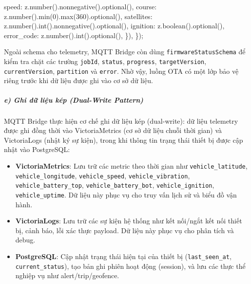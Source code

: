 \documentclass[13pt,a4paper]{extarticle}
\newenvironment{Shaded}{}{}
\newcommand{\DecValTok}[1]{\textcolor[rgb]{0.25,0.63,0.44}{#1}}
\newcommand{\FunctionTok}[1]{\textcolor[rgb]{0.02,0.16,0.49}{#1}}
\newcommand{\NormalTok}[1]{#1}
\newcommand{\OperatorTok}[1]{\textcolor[rgb]{0.40,0.40,0.40}{#1}}
\renewcommand{\\}{\thesislongtableorignewline\hline}%
\providecommand{\tightlist}{%
  \setlength{\itemsep}{0pt}\setlength{\parskip}{0pt}}
\begin{document}
\begin{Shaded}
\begin{Highlighting}[]
\NormalTok{    speed}\OperatorTok{:}\NormalTok{ z}\OperatorTok{.}\FunctionTok{number}\NormalTok{()}\OperatorTok{.}\FunctionTok{nonnegative}\NormalTok{()}\OperatorTok{.}\FunctionTok{optional}\NormalTok{()}\OperatorTok{,}
\NormalTok{    course}\OperatorTok{:}\NormalTok{ z}\OperatorTok{.}\FunctionTok{number}\NormalTok{()}\OperatorTok{.}\FunctionTok{min}\NormalTok{(}\DecValTok{0}\NormalTok{)}\OperatorTok{.}\FunctionTok{max}\NormalTok{(}\DecValTok{360}\NormalTok{)}\OperatorTok{.}\FunctionTok{optional}\NormalTok{()}\OperatorTok{,}
\NormalTok{    satellites}\OperatorTok{:}\NormalTok{ z}\OperatorTok{.}\FunctionTok{number}\NormalTok{()}\OperatorTok{.}\FunctionTok{int}\NormalTok{()}\OperatorTok{.}\FunctionTok{nonnegative}\NormalTok{()}\OperatorTok{.}\FunctionTok{optional}\NormalTok{()}\OperatorTok{,}
\NormalTok{    ignition}\OperatorTok{:}\NormalTok{ z}\OperatorTok{.}\FunctionTok{boolean}\NormalTok{()}\OperatorTok{.}\FunctionTok{optional}\NormalTok{()}\OperatorTok{,}
\NormalTok{    error\_code}\OperatorTok{:}\NormalTok{ z}\OperatorTok{.}\FunctionTok{number}\NormalTok{()}\OperatorTok{.}\FunctionTok{int}\NormalTok{()}\OperatorTok{.}\FunctionTok{optional}\NormalTok{()}\OperatorTok{,}
\NormalTok{  \})}\OperatorTok{,}
\NormalTok{\})}\OperatorTok{;}
\end{Highlighting}
\end{Shaded}

Ngoài schema cho telemetry, MQTT Bridge còn dùng
\texttt{firmwareStatusSchema} để kiểm tra chặt các trường
\texttt{jobId}, \texttt{status}, \texttt{progress},
\texttt{targetVersion}, \texttt{currentVersion}, \texttt{partition} và
\texttt{error}. Nhờ vậy, luồng OTA có một lớp bảo vệ riêng trước khi dữ
liệu được ghi vào cơ sở dữ liệu.

\subparagraph{e) Ghi dữ liệu kép (Dual-Write
Pattern)}\label{e-ghi-dux1eef-liux1ec7u-kuxe9p-dual-write-pattern}

MQTT Bridge thực hiện cơ chế ghi dữ liệu kép (dual-write): dữ liệu
telemetry được ghi đồng thời vào VictoriaMetrics (cơ sở dữ liệu chuỗi
thời gian) và VictoriaLogs (nhật ký sự kiện), trong khi thông tin trạng
thái thiết bị được cập nhật vào PostgreSQL:

\begin{itemize}
\tightlist
\item
  \textbf{VictoriaMetrics}: Lưu trữ các metric theo thời gian như
  \texttt{vehicle\_latitude}, \texttt{vehicle\_longitude},
  \texttt{vehicle\_speed}, \texttt{vehicle\_vibration},
  \texttt{vehicle\_battery\_top}, \texttt{vehicle\_battery\_bot},
  \texttt{vehicle\_ignition}, \texttt{vehicle\_uptime}. Dữ liệu này phục
  vụ cho truy vấn lịch sử và biểu đồ vận hành.
\item
  \textbf{VictoriaLogs}: Lưu trữ các sự kiện hệ thống như kết nối/ngắt
  kết nối thiết bị, cảnh báo, lỗi xác thực payload. Dữ liệu này phục vụ
  cho phân tích và debug.
\item
  \textbf{PostgreSQL}: Cập nhật trạng thái hiện tại của thiết bị
  (\texttt{last\_seen\_at}, \texttt{current\_status}), tạo bản ghi phiên
  hoạt động (session), và lưu các thực thể nghiệp vụ như
  alert/trip/geofence.
\end{itemize}
\end{document}
